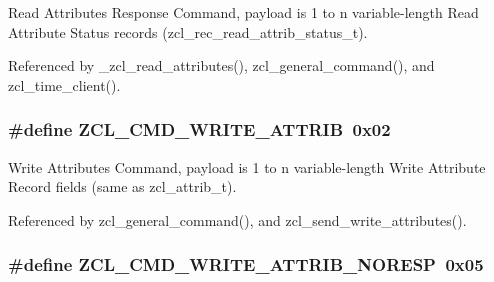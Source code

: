 Read Attributes Response Command, payload is 1 to n variable-\/length Read Attribute Status records (zcl\-\_\-rec\-\_\-read\-\_\-attrib\-\_\-status\-\_\-t). 



Referenced by \-\_\-zcl\-\_\-read\-\_\-attributes(), zcl\-\_\-general\-\_\-command(), and zcl\-\_\-time\-\_\-client().

\hypertarget{group__zcl_ga8843c2bcb861c091ae6f9a4e36f7e4d8}{
\subsubsection[{Z\-C\-L\-\_\-\-C\-M\-D\-\_\-\-W\-R\-I\-T\-E\-\_\-\-A\-T\-T\-R\-I\-B}]{\setlength{\rightskip}{0pt plus 5cm}\#define Z\-C\-L\-\_\-\-C\-M\-D\-\_\-\-W\-R\-I\-T\-E\-\_\-\-A\-T\-T\-R\-I\-B~0x02}}\label{group__zcl_ga8843c2bcb861c091ae6f9a4e36f7e4d8}


Write Attributes Command, payload is 1 to n variable-\/length Write Attribute Record fields (same as zcl\-\_\-attrib\-\_\-t). 



Referenced by zcl\-\_\-general\-\_\-command(), and zcl\-\_\-send\-\_\-write\-\_\-attributes().

\hypertarget{group__zcl_ga57091c6a11fbc2680ac63fa262bf74ca}{
\subsubsection[{Z\-C\-L\-\_\-\-C\-M\-D\-\_\-\-W\-R\-I\-T\-E\-\_\-\-A\-T\-T\-R\-I\-B\-\_\-\-N\-O\-R\-E\-S\-P}]{\setlength{\rightskip}{0pt plus 5cm}\#define Z\-C\-L\-\_\-\-C\-M\-D\-\_\-\-W\-R\-I\-T\-E\-\_\-\-A\-T\-T\-R\-I\-B\-\_\-\-N\-O\-R\-E\-S\-P~0x05}}\label{group__zcl_ga57091c6a11fbc2680ac63fa262bf74ca}


